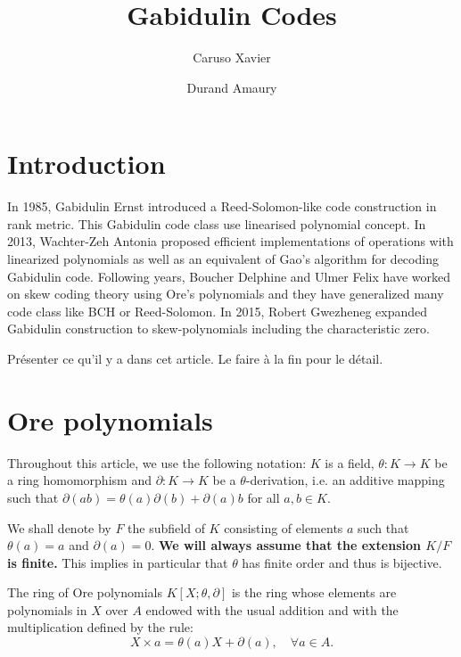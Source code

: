 \documentclass[a4paper]{llncs}
\author{Caruso Xavier \and Durand Amaury}
\institute{Institute : to do}
\title{Gabidulin Codes}
\def\todo#1{{\color{todo} #1}}
\begin{document}
\maketitle

\section{Introduction}

In 1985, Gabidulin Ernst introduced a Reed-Solomon-like code 
construction in rank metric. This Gabidulin code class use linearised 
polynomial concept. In 2013, Wachter-Zeh Antonia proposed efficient 
implementations of operations with linearized polynomials as well as an 
equivalent of Gao's algorithm for decoding Gabidulin code. Following 
years, Boucher Delphine and Ulmer Felix have worked on skew coding 
theory using Ore's polynomials and they have generalized many code class 
like BCH or Reed-Solomon. In 2015, Robert Gwezheneg expanded Gabidulin 
construction to skew-polynomials including the characteristic zero.

\todo{Présenter ce qu'il y a dans cet article. Le faire à la fin 
pour le détail.}

\section{Ore polynomials}

Throughout this article, we use the following notation: $K$ is a field, 
$\theta : K \to K$ be a ring homomorphism and $\partial : K \to K$ be a 
$\theta$-derivation, i.e. an additive mapping such that $\partial(ab) = 
\theta(a)\partial(b) + \partial(a)b$ for all $a,b \in K$.

We shall denote by $F$ the subfield of $K$ consisting of elements
$a$ such that $\theta(a) = a$ and $\partial(a) = 0$. 
\textbf{We will always assume that the extension $K/F$ is finite.}
This implies in particular that $\theta$ has finite order and thus
is bijective.


\begin{definition}
The ring of Ore polynomials $K[X; \theta, \partial]$ is the ring 
whose elements are polynomials in $X$ over $A$ endowed with the usual 
addition and with the multiplication defined by the rule:
$$X \times a = \theta(a)X + \partial(a), \quad \forall a \in A.$$
%
%
\end{definition}
\end{document}
